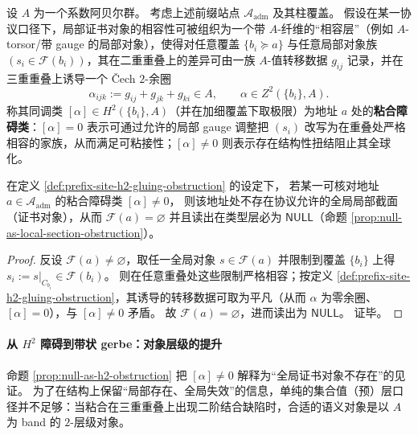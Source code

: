 \begin{definition}\label{def:prefix-site-h2-gluing-obstruction}
设 \(A\) 为一个系数阿贝尔群。
考虑上述前缀站点 \(\mathcal{A}_{\mathrm{adm}}\) 及其柱覆盖。
假设在某一协议口径下，局部证书对象的相容性可被组织为一个带 \(A\)-纤维的“相容层”（例如 \(A\)-torsor/带 gauge 的局部对象），使得对任意覆盖 \(\{b_i\succeq a\}\) 与任意局部对象族 \((s_i\in\mathscr{F}(b_i))\)，其在二重重叠上的差异可由一族 \(A\)-值转移数据 \(g_{ij}\) 记录，并在三重重叠上诱导一个 Čech \(2\)-余圈
\[
\alpha_{ijk}:=g_{ij}+g_{jk}+g_{ki}\in A,
\qquad
\alpha\in Z^2(\{b_i\},A).
\]
称其同调类 \([\alpha]\in H^2(\{b_i\},A)\)（并在加细覆盖下取极限）为地址 \(a\) 处的\textbf{粘合障碍类}：\([\alpha]=0\) 表示可通过允许的局部 gauge 调整把 \((s_i)\) 改写为在重叠处严格相容的家族，从而满足可粘接性；\([\alpha]\neq 0\) 则表示存在结构性扭结阻止其全球化。
\end{definition}

\begin{proposition}\label{prop:null-as-h2-obstruction}
在定义 \ref{def:prefix-site-h2-gluing-obstruction} 的设定下，
若某一可核对地址 \(a\in\mathcal{A}_{\mathrm{adm}}\) 的粘合障碍类 \([\alpha]\neq 0\)，
则该地址处不存在协议允许的全局局部截面（证书对象），从而
\(
\mathscr{F}(a)=\varnothing
\)
并且读出在类型层必为 \(\mathsf{NULL}\)（命题 \ref{prop:null-as-local-section-obstruction}）。
\end{proposition}

\begin{proof}
反设 \(\mathscr{F}(a)\neq\varnothing\)，取任一全局对象 \(s\in\mathscr{F}(a)\) 并限制到覆盖 \(\{b_i\}\) 上得 \(s_i:=s|_{C_{b_i}}\in\mathscr{F}(b_i)\)。
则在任意重叠处这些限制严格相容；按定义 \ref{def:prefix-site-h2-gluing-obstruction}，其诱导的转移数据可取为平凡（从而 \(\alpha\) 为零余圈、\([\alpha]=0\)），与 \([\alpha]\neq 0\) 矛盾。
故 \(\mathscr{F}(a)=\varnothing\)，进而读出为 \(\mathsf{NULL}\)。
证毕。
\end{proof}

\paragraph{从 \(H^2\) 障碍到带状 gerbe：对象层级的提升}
命题 \ref{prop:null-as-h2-obstruction} 把 \([\alpha]\neq 0\) 解释为“全局证书对象不存在”的见证。
为了在结构上保留“局部存在、全局失效”的信息，单纯的集合值（预）层口径并不足够：当粘合在三重重叠上出现二阶结合缺陷时，合适的语义对象是以 \(A\) 为 band 的 \(2\)-层级对象。

